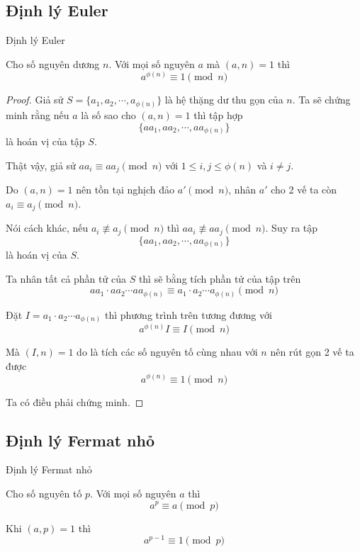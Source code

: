 \subsection{Định lý Euler}

\begin{theoremblock}{Định lý Euler}
    
    Cho số nguyên dương $n$. Với mọi số nguyên $a$ mà $(a, n) = 1$ thì $$a^{\phi(n)} \equiv 1 \pmod n$$
\end{theoremblock}

\begin{proof}
    Giả sử $S = \{a_1, a_2, \cdots, a_{\phi(n)}\}$ là hệ thặng dư thu gọn của $n$. Ta sẽ chứng minh rằng nếu $a$ là số sao cho $(a, n)=1$ thì tập hợp
    $$\{a a_1, a a_2, \cdots, a a_{\phi(n)}\}$$ là hoán vị của tập $S$.

    Thật vậy, giả sử $a a_i \equiv a a_j \pmod n$ với $1 \leq i, j \leq \phi(n)$ và $i \neq j$.

    Do $(a, n) = 1$ nên tồn tại nghịch đảo $a' \pmod n$, nhân $a'$ cho 2 vế ta còn $a_i \equiv a_j \pmod n$.

    Nói cách khác, nếu $a_i \not\equiv a_j \pmod n$ thì $a a_i \not\equiv a a_j \pmod n$. Suy ra tập
    $$\{a a_1, a a_2, \cdots, a a_{\phi(n)}\}$$ là hoán vị của $S$.

    Ta nhân tất cả phần tử của $S$ thì sẽ bằng tích phần tử của tập trên
    $$a a_1 \cdot a a_2 \cdots a a_{\phi(n)} \equiv a_1 \cdot a_2 \cdots a_{\phi(n)} \pmod n$$

    Đặt $I = a_1 \cdot a_2 \cdots a_{\phi(n)}$ thì phương trình trên tương đương với 
    $$a^{\phi(n)} I \equiv I \pmod n$$
    
    Mà $(I, n) = 1$ do là tích các số nguyên tố cùng nhau với $n$ nên rút gọn 2 vế ta được
    $$a^{\phi(n)} \equiv 1 \pmod n$$

    Ta có điều phải chứng minh.
\end{proof}

\subsection{Định lý Fermat nhỏ}

\begin{theoremblock}{Định lý Fermat nhỏ}
    
    Cho số nguyên tố $p$. Với mọi số nguyên $a$ thì $$a^p \equiv a \pmod p$$

    Khi $(a, p) = 1$ thì $$a^{p-1} \equiv 1 \pmod p$$
\end{theoremblock}

